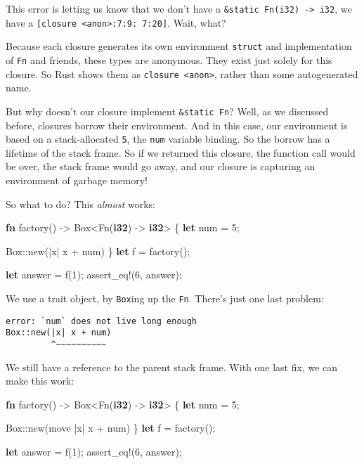 \documentclass[a4paper,]{book}
\newenvironment{Shaded}{\begin{snugshade}}{\end{snugshade}}
\newcommand{\KeywordTok}[1]{\textcolor[rgb]{0.13,0.29,0.53}{\textbf{{#1}}}}
\newcommand{\DecValTok}[1]{\textcolor[rgb]{0.00,0.00,0.81}{{#1}}}
\newcommand{\OtherTok}[1]{\textcolor[rgb]{0.56,0.35,0.01}{{#1}}}
\newcommand{\NormalTok}[1]{{#1}}
\begin{document}
This error is letting us know that we don't have a
\texttt{\&\textquotesingle{}static\ Fn(i32)\ -\textgreater{}\ i32}, we
have a \texttt{{[}closure\ \textless{}anon\textgreater{}:7:9:\ 7:20{]}}.
Wait, what?

Because each closure generates its own environment \texttt{struct} and
implementation of \texttt{Fn} and friends, these types are anonymous.
They exist just solely for this closure. So Rust shows them as
\texttt{closure\ \textless{}anon\textgreater{}}, rather than some
autogenerated name.

But why doesn't our closure implement
\texttt{\&\textquotesingle{}static\ Fn}? Well, as we discussed before,
closures borrow their environment. And in this case, our environment is
based on a stack-allocated \texttt{5}, the \texttt{num} variable
binding. So the borrow has a lifetime of the stack frame. So if we
returned this closure, the function call would be over, the stack frame
would go away, and our closure is capturing an environment of garbage
memory!

So what to do? This \emph{almost} works:

\begin{Shaded}
\begin{Highlighting}[]
\KeywordTok{fn} \NormalTok{factory() -> Box<Fn(}\KeywordTok{i32}\NormalTok{) -> }\KeywordTok{i32}\NormalTok{> \{}
    \KeywordTok{let} \NormalTok{num = }\DecValTok{5}\NormalTok{;}

    \NormalTok{Box::new(|x| x + num)}
\NormalTok{\}}
\KeywordTok{let} \NormalTok{f = factory();}

\KeywordTok{let} \NormalTok{answer = f(}\DecValTok{1}\NormalTok{);}
\OtherTok{assert_eq!}\NormalTok{(}\DecValTok{6}\NormalTok{, answer);}
\end{Highlighting}
\end{Shaded}

We use a trait object, by \texttt{Box}ing up the \texttt{Fn}. There's
just one last problem:

\begin{verbatim}
error: `num` does not live long enough
Box::new(|x| x + num)
         ^~~~~~~~~~~
\end{verbatim}

We still have a reference to the parent stack frame. With one last fix,
we can make this work:

\begin{Shaded}
\begin{Highlighting}[]
\KeywordTok{fn} \NormalTok{factory() -> Box<Fn(}\KeywordTok{i32}\NormalTok{) -> }\KeywordTok{i32}\NormalTok{> \{}
    \KeywordTok{let} \NormalTok{num = }\DecValTok{5}\NormalTok{;}

    \NormalTok{Box::new(move |x| x + num)}
\NormalTok{\}}
\KeywordTok{let} \NormalTok{f = factory();}

\KeywordTok{let} \NormalTok{answer = f(}\DecValTok{1}\NormalTok{);}
\OtherTok{assert_eq!}\NormalTok{(}\DecValTok{6}\NormalTok{, answer);}
\end{Highlighting}
\end{Shaded}
\end{document}
